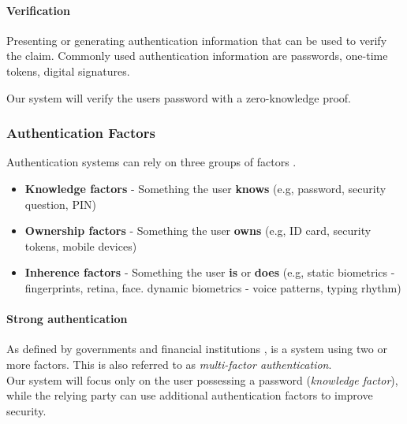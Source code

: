 
\paragraph{Verification} Presenting or generating authentication information that can be used to verify the claim.
Commonly used authentication information are passwords, one-time tokens, digital signatures.

Our system will verify the users password with a zero-knowledge proof.

\subsubsection{Authentication Factors}

Authentication systems can rely on three groups of factors \cite{bignell2006authentication}.

\begin{itemize}
	\item \textbf{Knowledge factors} - Something the user \textbf{knows} (e.g, password, security question, PIN)
	\item \textbf{Ownership factors} - Something the user \textbf{owns} (e.g, ID card, security tokens, mobile devices)
	\item \textbf{Inherence factors} - Something the user \textbf{is} or \textbf{does} (e.g, static biometrics - fingerprints, retina, face. dynamic biometrics - voice patterns, typing rhythm)
\end{itemize}

\paragraph{Strong authentication} As defined by governments and financial institutions \cite{cnss2006national, ecb2013recommendations}, is a system using two or more factors.
This is also referred to as \textit{multi-factor authentication}.\\
\newline
Our system will focus only on the user possessing a password (\textit{knowledge factor}), while the relying party can use additional authentication factors to improve security.

\newpage